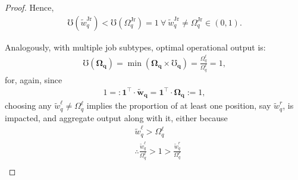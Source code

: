 \documentclass[hidelinks, nonatbib]{elsarticle}
\begin{document}
\begin{lemma}
\begin{proof}
        Hence, 
        \begin{gather}
            \mho(\tilde{w}_{q}^{\text{Jr}}) < 
            \mho(\Omega_{q}^{\text{Jr}}) 
            = 1
            \
            \forall
            \
            \tilde{w}_{q}^{\text{Jr}}
            \neq
            \Omega_{q}^{\text{Jr}}
            \in 
            (0,1)
            .
        \end{gather}
        
        Analogously, with multiple job subtypes, optimal operational output is:
        \begin{gather}
            \mho(\boldsymbol{\Omega_q})
            = 
            \min(
                \boldsymbol{\Omega_q}
                \times
                \boldsymbol{\mho_q}
            )
            =
            \frac{
                \Omega_{q}^{\ell}
            }{
                \Omega_{q}^{\ell}
            }
            =
            1
            ,
        \end{gather}
        for, again, since
        \begin{gather}
            1
            =:
            \boldsymbol{1} ^ {\top}
            \cdot
            \boldsymbol{\tilde{w}_{q}}
            =
            \boldsymbol{1} ^ {\top}
            \cdot
            \boldsymbol{\Omega_{q}}
            := 1
            ,
        \end{gather}
        choosing any $\tilde{w}_{q}^{\ell} \neq \Omega_{q}^{\ell}$ implies the proportion of at least one position, say $\tilde{w}_{q}^{r}$, is impacted, and aggregate output along with it, either because
        \begin{align}
            &
            \tilde{w}_{q}^{\ell} > \Omega_{q}^{\ell}
            \\
            &\therefore
            \frac{
                \tilde{w}_{q}^{\ell}
            }{
                \Omega_{q}^{\ell}
            }
            > 
            1
            > 
            \frac{
                \tilde{w}_{q}^{r}
            }{
                \Omega_{q}^{r}
            }
            \\

\end{align}
\end{proof}
\end{lemma}
\end{document}
